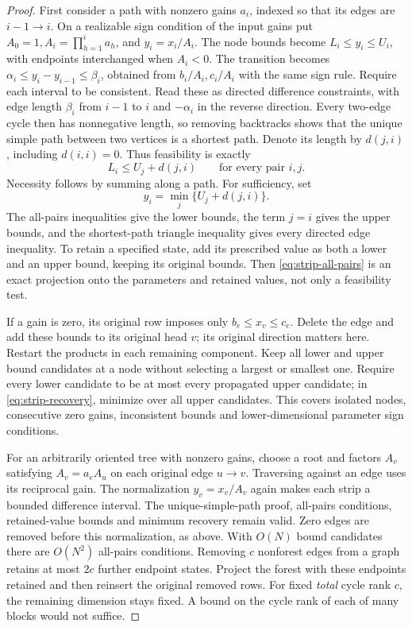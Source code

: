 \begin{proof}
First consider a path with nonzero gains \(a_i\), indexed so that its edges are
\(i-1\to i\). On a realizable sign condition of the input gains put
\(A_0=1,A_i=\prod_{h=1}^i a_h\), and \(y_i=x_i/A_i\).
The node bounds become \(L_i\le y_i\le U_i\), with endpoints interchanged
when \(A_i<0\). The transition becomes
\(\alpha_i\le y_i-y_{i-1}\le\beta_i\), obtained from \(b_i/A_i,c_i/A_i\)
with the same sign rule. Require each interval to be consistent. Read
these as directed difference constraints, with edge length \(\beta_i\) from
\(i-1\) to \(i\) and \(-\alpha_i\) in the reverse direction. Every two-edge
cycle then has nonnegative length, so removing backtracks shows that the
unique simple path between two vertices is a shortest path. Denote its length by
\(d(j,i)\), including \(d(i,i)=0\). Thus feasibility is exactly
\begin{equation}\label{eq:strip-all-pairs}
 L_i\le U_j+d(j,i)\qquad\text{for every pair }i,j.
\end{equation}
Necessity follows by summing along a path. For sufficiency, set
\begin{equation}\label{eq:strip-recovery}
 y_i=\min_j\{U_j+d(j,i)\}.
\end{equation}
The all-pairs inequalities give the lower bounds, the term \(j=i\) gives the
upper bounds, and the shortest-path triangle inequality gives every directed
edge inequality. To retain a specified state, add its prescribed value as
both a lower and an upper bound, keeping its original bounds. Then
\eqref{eq:strip-all-pairs} is an exact projection onto the parameters and
retained values, not only a feasibility test.

If a gain is zero, its original row imposes only \(b_e\le x_v\le c_e\).
Delete the edge and add these bounds to its original head \(v\); its original
direction matters here. Restart the products in each remaining component.
Keep all lower and upper bound candidates at a node without selecting a
largest or smallest one. Require every lower candidate to be at most every
propagated upper candidate; in \eqref{eq:strip-recovery}, minimize over all
upper candidates. This covers isolated nodes, consecutive zero gains,
inconsistent bounds and lower-dimensional parameter sign conditions.

For an arbitrarily oriented tree with nonzero gains, choose a root and factors
\(A_v\) satisfying \(A_v=a_e A_u\) on each original edge \(u\to v\).
Traversing against an edge uses its reciprocal gain. The normalization
\(y_v=x_v/A_v\) again makes each strip a bounded difference interval.
The unique-simple-path proof, all-pairs conditions, retained-value bounds and
minimum recovery remain valid. Zero edges are removed before this
normalization, as above. With \(O(N)\) bound candidates there are \(O(N^2)\)
all-pairs conditions. Removing \(c\) nonforest edges from a graph retains at
most \(2c\) further endpoint states. Project the forest with these endpoints
retained and then reinsert the original removed rows. For fixed \emph{total}
cycle rank \(c\), the remaining dimension stays fixed. A bound on the cycle
rank of each of many blocks would not suffice.


\end{proof}
